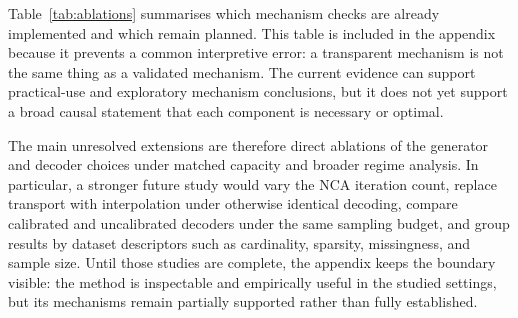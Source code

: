Table~\ref{tab:ablations} summarises which mechanism checks are already
implemented and which remain planned. This table is included in the appendix
because it prevents a common interpretive error: a transparent mechanism is not
the same thing as a validated mechanism. The current evidence can support
practical-use and exploratory mechanism conclusions, but it does not yet
support a broad causal statement that each component is necessary or optimal.

The main unresolved extensions are therefore direct ablations of the generator
and decoder choices under matched capacity and broader regime analysis. In
particular, a stronger future study would vary the NCA iteration count, replace
transport with interpolation under otherwise identical decoding, compare
calibrated and uncalibrated decoders under the same sampling budget, and group
results by dataset descriptors such as cardinality, sparsity, missingness, and
sample size. Until those studies are complete, the appendix keeps the boundary
visible: the method is inspectable and empirically useful in the studied
settings, but its mechanisms remain partially supported rather than fully
established.



